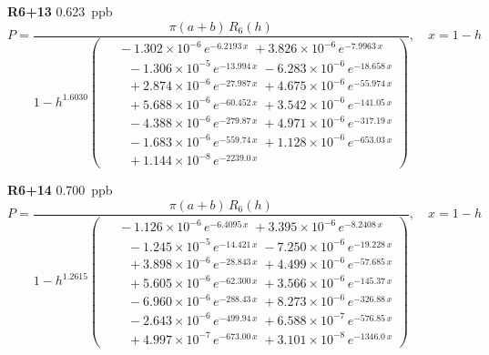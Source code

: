 \documentclass[12pt]{article}
\begin{document}
\noindent\textbf{R6+13} 0.623~ppb\nopagebreak
\begin{equation*}
P = \frac{\pi(a{+}b)\,R_6(h)}{1 - h^{1.6030}\!\left(\!\begin{aligned}
  &\; -1.302{\times}10^{-6}\,e^{-6.2193\,x} \; +3.826{\times}10^{-6}\,e^{-7.9963\,x} \\[-3pt]
  &\quad -1.306{\times}10^{-5}\,e^{-13.994\,x} \; -6.283{\times}10^{-6}\,e^{-18.658\,x} \\[-3pt]
  &\quad +2.874{\times}10^{-6}\,e^{-27.987\,x} \; +4.675{\times}10^{-6}\,e^{-55.974\,x} \\[-3pt]
  &\quad +5.688{\times}10^{-6}\,e^{-60.452\,x} \; +3.542{\times}10^{-6}\,e^{-141.05\,x} \\[-3pt]
  &\quad -4.388{\times}10^{-6}\,e^{-279.87\,x} \; +4.971{\times}10^{-6}\,e^{-317.19\,x} \\[-3pt]
  &\quad -1.683{\times}10^{-6}\,e^{-559.74\,x} \; +1.128{\times}10^{-6}\,e^{-653.03\,x} \\[-3pt]
  &\quad +1.144{\times}10^{-8}\,e^{-2239.0\,x}
\end{aligned}\!\right)}, \quad x = 1{-}h
\end{equation*}

\noindent\textbf{R6+14} 0.700~ppb\nopagebreak
\begin{equation*}
P = \frac{\pi(a{+}b)\,R_6(h)}{1 - h^{1.2615}\!\left(\!\begin{aligned}
  &\; -1.126{\times}10^{-6}\,e^{-6.4095\,x} \; +3.395{\times}10^{-6}\,e^{-8.2408\,x} \\[-3pt]
  &\quad -1.245{\times}10^{-5}\,e^{-14.421\,x} \; -7.250{\times}10^{-6}\,e^{-19.228\,x} \\[-3pt]
  &\quad +3.898{\times}10^{-6}\,e^{-28.843\,x} \; +4.499{\times}10^{-6}\,e^{-57.685\,x} \\[-3pt]
  &\quad +5.605{\times}10^{-6}\,e^{-62.300\,x} \; +3.566{\times}10^{-6}\,e^{-145.37\,x} \\[-3pt]
  &\quad -6.960{\times}10^{-6}\,e^{-288.43\,x} \; +8.273{\times}10^{-6}\,e^{-326.88\,x} \\[-3pt]
  &\quad -2.643{\times}10^{-6}\,e^{-499.94\,x} \; +6.588{\times}10^{-7}\,e^{-576.85\,x} \\[-3pt]
  &\quad +4.997{\times}10^{-7}\,e^{-673.00\,x} \; +3.101{\times}10^{-8}\,e^{-1346.0\,x}
\end{aligned}\!\right)}, \quad x = 1{-}h
\end{equation*}
\end{document}
